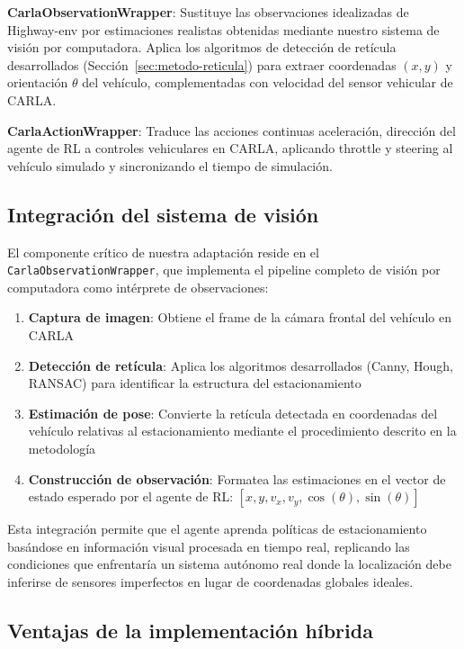 \textbf{CarlaObservationWrapper}: Sustituye las observaciones idealizadas de Highway-env por estimaciones
realistas obtenidas mediante nuestro sistema de visión por computadora. Aplica los algoritmos de detección
de retícula desarrollados (Sección~\ref{sec:metodo-reticula}) para extraer coordenadas $(x,y)$ y orientación
$\theta$ del vehículo, complementadas con velocidad del sensor vehicular de CARLA.


\textbf{CarlaActionWrapper}: Traduce las acciones continuas 
aceleración, dirección del agente de RL
a controles vehiculares en CARLA, aplicando throttle y steering al vehículo simulado 
y sincronizando
el tiempo de simulación.

\subsection{Integración del sistema de visión}

El componente crítico de nuestra adaptación reside en el \texttt{CarlaObservationWrapper}, que implementa
el pipeline completo de visión por computadora como intérprete de observaciones:

\begin{enumerate}
    \item \textbf{Captura de imagen}: Obtiene el frame de la cámara frontal del vehículo en CARLA
    \item \textbf{Detección de retícula}: Aplica los algoritmos desarrollados (Canny, Hough, RANSAC)
    para identificar la estructura del estacionamiento
    \item \textbf{Estimación de pose}: Convierte la retícula detectada en coordenadas del vehículo
    relativas al estacionamiento mediante el procedimiento descrito en la metodología
    \item \textbf{Construcción de observación}: Formatea las estimaciones en el vector de estado
    esperado por el agente de RL: $[x, y, v_x, v_y, \cos(\theta), \sin(\theta)]$
\end{enumerate}


Esta integración permite que el agente aprenda políticas de estacionamiento basándose en información
visual procesada en tiempo real, replicando las condiciones que enfrentaría un sistema autónomo real
donde la localización debe inferirse de sensores imperfectos en lugar de coordenadas globales ideales.

\subsection{Ventajas de la implementación híbrida}

